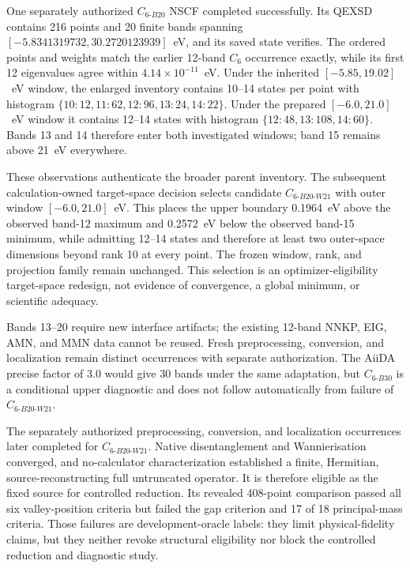 \documentclass[11pt]{article}
\begin{document}
One separately authorized $C_{6\text{-}B20}$ NSCF completed successfully.  Its QEXSD
contains 216 points and 20 finite bands spanning $[-5.8341319732,30.2720123939]$~eV,
and its saved state verifies.  The ordered points and weights match the earlier
12-band $C_6$ occurrence exactly, while its first 12 eigenvalues agree within
$4.14\times10^{-11}$~eV.  Under the inherited $[-5.85,19.02]$~eV window, the enlarged
inventory contains 10--14 states per point with histogram
$\{10\!:\!12,11\!:\!62,12\!:\!96,13\!:\!24,14\!:\!22\}$.  Under the prepared
$[-6.0,21.0]$~eV window it contains 12--14 states with histogram
$\{12\!:\!48,13\!:\!108,14\!:\!60\}$.  Bands 13 and 14 therefore enter both
investigated windows; band 15 remains above 21~eV everywhere.

These observations authenticate the broader parent inventory.  The subsequent
calculation-owned target-space decision selects candidate
$C_{6\text{-}B20\text{-}W21}$ with outer window $[-6.0,21.0]$~eV.  This places the
upper boundary 0.1964~eV above the observed band-12 maximum and 0.2572~eV below the
observed band-15 minimum, while admitting 12--14 states and therefore at least two
outer-space dimensions beyond rank 10 at every point.  The frozen window, rank, and
projection family remain unchanged.  This selection is an optimizer-eligibility
target-space redesign, not evidence of convergence, a global minimum, or scientific
adequacy.

Bands 13--20 require new interface artifacts; the existing 12-band NNKP, EIG, AMN, and
MMN data cannot be reused.  Fresh preprocessing, conversion, and localization remain
distinct occurrences with separate authorization.  The AiiDA precise factor of 3.0
would give 30 bands under the same adaptation, but $C_{6\text{-}B30}$ is a conditional
upper diagnostic and does not follow automatically from failure of
$C_{6\text{-}B20\text{-}W21}$.

The separately authorized preprocessing, conversion, and localization occurrences later
completed for $C_{6\text{-}B20\text{-}W21}$.  Native disentanglement and
Wannierisation converged, and no-calculator characterization established a finite,
Hermitian, source-reconstructing full untruncated operator.  It is therefore eligible as
the fixed source for controlled reduction.  Its revealed 408-point comparison passed
all six valley-position criteria but failed the gap criterion and 17 of 18
principal-mass criteria.  Those failures are development-oracle labels: they limit
physical-fidelity claims, but they neither revoke structural eligibility nor block the
controlled reduction and diagnostic study.
\end{document}
